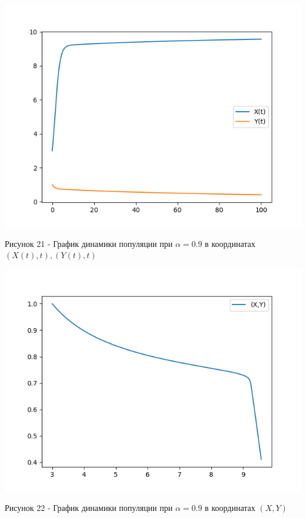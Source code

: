 \documentclass[a4paper,14pt]{extreport}
\begin{document}
\begin{center}
    \begin{minipage}[htb]{0.8\linewidth}
    \includegraphics[width=14cm]{n13.png}
    \end{minipage}
    \end{center}
    \begin{center}
        Рисунок 21 - График динамики популяции при $\alpha = 0.9$ в координатах $(X(t),t),(Y(t),t)$
    \end{center}
    \begin{center}
    \begin{minipage}[htb]{0.8\linewidth}
    \includegraphics[width=14cm]{13.png}
    \end{minipage}
    \end{center}
    \begin{center}
        Рисунок 22 - График динамики популяции при $\alpha = 0.9$ в координатах $(X,Y)$  
    \end{center}
\end{document}

